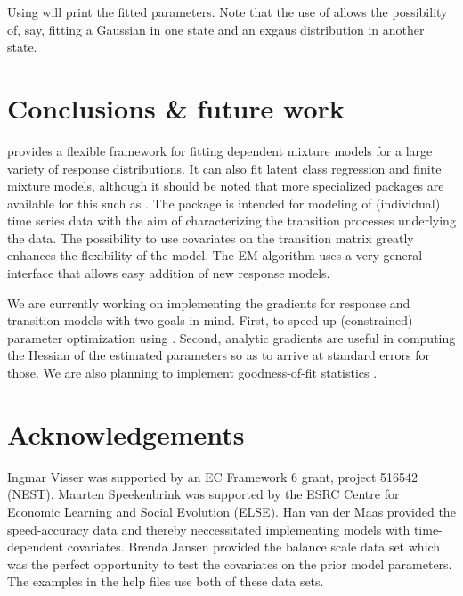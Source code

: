 \documentclass[article]{jss}
\begin{document}
Using  will print the fitted parameters. Note that the 
use of  allows the possibility of, say, fitting a 
Gaussian in one state and an exgaus distribution in another state. 


\section[Conclusions and future work]{Conclusions \& future work}

 provides a flexible framework for fitting dependent mixture models
for a large variety of response distributions. It can also fit latent class regression
and finite mixture models, although it should be noted that more specialized packages 
are available for this such as  \citep{Leisch2004}. The package is intended
for modeling of (individual) time series data with the aim of characterizing the transition 
processes underlying the data. The possibility to use covariates on the transition matrix
greatly enhances the flexibility of the model. The EM algorithm uses a very general 
interface that allows easy addition of new response models. 

We are currently working on implementing the gradients for response and transition models 
with two goals in mind. First, to speed up (constrained) parameter optimization using 
. Second, analytic gradients are useful in computing the Hessian of the
estimated parameters so as to arrive at standard errors for those. We are also planning to
implement goodness-of-fit statistics \citep{Titman2008}. 


\section*{Acknowledgements} 

Ingmar Visser was supported by an EC Framework 6 grant, project 516542
(NEST).  Maarten Speekenbrink was supported by the ESRC Centre for
Economic Learning and Social Evolution (ELSE).  Han van der Maas
provided the speed-accuracy data \cite{Dutilh2009} and thereby
neccessitated implementing models with time-dependent covariates.
Brenda Jansen provided the balance scale data set \citep{Jansen2002}
which was the perfect opportunity to test the covariates on the prior
model parameters.  The examples in the help files use both of these
data sets.


\end{document}
